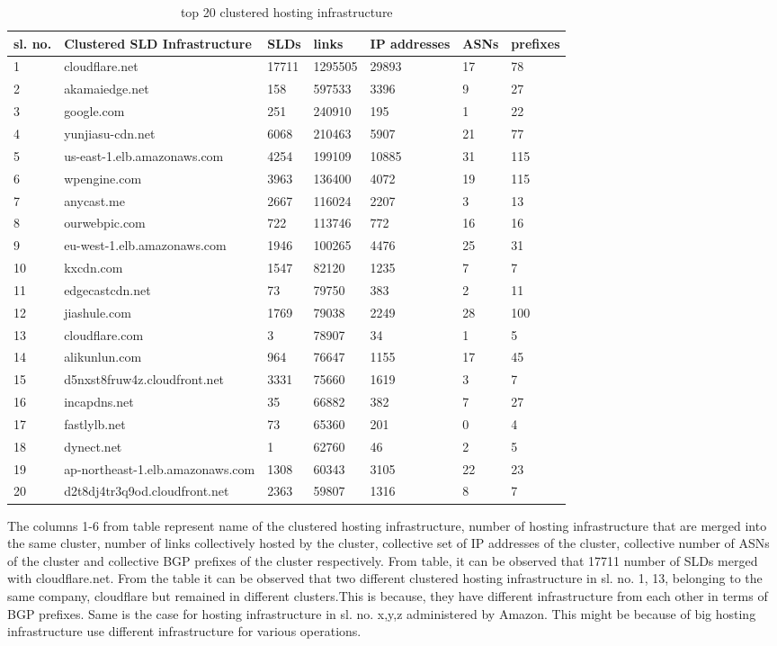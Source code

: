 \begin{table}[htb]
\centering
\begin{tabular}[t]{|p{}|p{}||p{}||p{}|p{}||p{}||p{}|}
\hline
sl. no.& Clustered SLD Infrastructure    & SLDs & links& IP addresses& ASNs& prefixes \\
\hline
\hline
1&cloudflare.net& 17711& 1295505& 29893& 17 &78\\
2&akamaiedge.net& 158& 597533& 3396& 9 &27\\
3&google.com& 251& 240910& 195& 1&22\\
4&yunjiasu-cdn.net& 6068& 210463& 5907& 21&77\\
5&us-east-1.elb.amazonaws.com& 4254& 199109& 10885& 31&115\\
6&wpengine.com& 3963& 136400& 4072& 19&115\\
7&anycast.me& 2667& 116024& 2207& 3&13\\
8&ourwebpic.com& 722& 113746& 772& 16&16\\
9&eu-west-1.elb.amazonaws.com& 1946& 100265& 4476& 25&31\\
10&kxcdn.com& 1547& 82120& 1235& 7&7\\
11&edgecastcdn.net& 73& 79750& 383& 2&11\\
12&jiashule.com& 1769& 79038& 2249& 28&100\\
13&cloudflare.com& 3& 78907& 34& 1&5\\
14&alikunlun.com& 964& 76647& 1155& 17&45\\
15&d5nxst8fruw4z.cloudfront.net& 3331& 75660& 1619& 3&7\\
16&incapdns.net& 35& 66882& 382& 7&27\\
17&fastlylb.net& 73& 65360& 201& 0&4\\
18&dynect.net& 1& 62760& 46& 2&5\\
19&ap-northeast-1.elb.amazonaws.com& 1308& 60343& 3105& 22&23\\
20&d2t8dj4tr3q9od.cloudfront.net& 2363& 59807& 1316& 8&7\\
\hline
\end{tabular}
\caption{top 20 clustered hosting infrastructure}
\label{tab:s1approcsupport1}
\end{table}

\noindent The columns 1-6 from table represent name of the clustered hosting infrastructure, number of hosting infrastructure that are merged into the same cluster, number of links collectively hosted by the cluster, collective set of IP addresses of the cluster, collective number of ASNs of the cluster and collective  BGP prefixes of the cluster respectively.
From table, it can be observed that 17711 number of SLDs merged with cloudflare.net. From the table it can be observed that two different clustered hosting infrastructure in sl. no. 1, 13, belonging to the same company, cloudflare but remained in different clusters.This is because, they have different infrastructure from each other in terms of BGP prefixes. Same is the case for hosting infrastructure in sl. no. x,y,z administered by Amazon. This might be because of big hosting infrastructure use different infrastructure for various operations.\\

